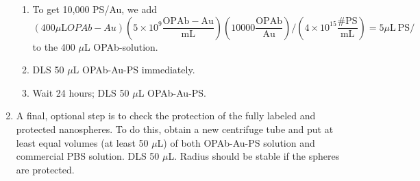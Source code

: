 \begin{enumerate}
\begin{enumerate}
\item To get 10,000 PS\slash Au, we add
\[\left(400 \mu\mathrm{L} OPAb-Au\right)\left(5\times10^9\mathrm{\frac{OPAb-Au}{mL}}\right)\left(10000\mathrm{\frac{OPAb}{Au}}\right)/\left(4\times10^{15} \mathrm{\frac{\#PS}{mL}}\right)=5\mu\mathrm{L\ PS/}\]
to the 400 $\mu$L OPAb-solution.

\item DLS 50 $\mu$L OPAb-Au-PS immediately.

\item Wait 24 hours; DLS 50 $\mu$L OPAb-Au-PS.

\end{enumerate}

\item A final, optional step is to check the protection of the fully labeled and protected nanospheres. To do this, obtain a new centrifuge tube and put at least equal volumes (at least 50 $\mu$L) of both OPAb-Au-PS solution and commercial PBS solution. DLS 50 $\mu$L. Radius should be stable if the spheres are protected.

\end{enumerate}
